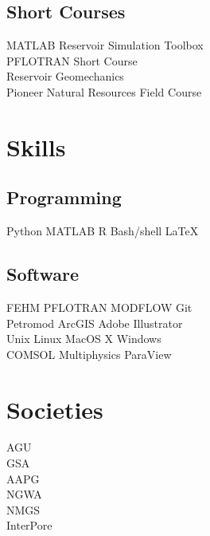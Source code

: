 \documentclass[]{deedy-resume-openfont}
\begin{document}
\begin{minipage}[t]{0.33\textwidth}
\subsection{Short Courses}
MATLAB Reservoir Simulation Toolbox \\
PFLOTRAN Short Course \\
Reservoir Geomechanics \\
Pioneer Natural Resources Field Course


\section{Skills}
\subsection{Programming}
Python 
\textbullet{} MATLAB 
\textbullet{} R 
\textbullet{} Bash/shell
\textbullet{} \LaTeX

\subsection{Software}
FEHM 
\textbullet{} PFLOTRAN 
\textbullet{} MODFLOW
\textbullet{} Git 
\\ Petromod
\textbullet{} ArcGIS 
\textbullet{} Adobe Illustrator
\\ Unix \textbullet{} Linux \textbullet{} MacOS X \textbullet{} Windows
\\ COMSOL Multiphysics \textbullet{} ParaView


\section{Societies}
AGU\\
GSA\\
AAPG\\
NGWA\\
NMGS\\
InterPore
\sectionsep

%
%
\end{minipage}
\hfill
\end{document}

